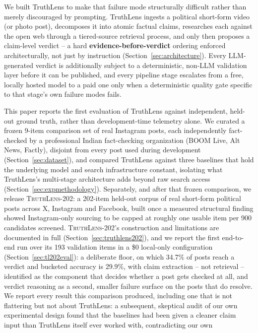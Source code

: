 \documentclass[conference]{IEEEtran}
\begin{document}
We built TruthLens to make that failure mode structurally difficult
rather than merely discouraged by prompting. TruthLens ingests a
political short-form video (or photo post), decomposes it into atomic
factual claims, researches each against the open web through a
tiered-source retrieval process, and only then proposes a claim-level
verdict -- a hard \textbf{evidence-before-verdict} ordering enforced
architecturally, not just by instruction (Section~\ref{sec:architecture}).
Every LLM-generated verdict is additionally subject to a deterministic,
non-LLM validation layer before it can be published, and every pipeline
stage escalates from a free, locally hosted model to a paid one only when
a deterministic quality gate specific to that stage's own failure modes
fails.

This paper reports the first evaluation of TruthLens against independent,
held-out ground truth, rather than development-time telemetry alone. We
curated a frozen 9-item comparison set of real Instagram posts, each
independently fact-checked by a professional Indian fact-checking
organization (BOOM Live, Alt News, Factly), disjoint from every post
used during development (Section~\ref{sec:dataset}), and compared
TruthLens against three baselines that hold the underlying model and
search infrastructure constant, isolating what TruthLens's multi-stage
architecture adds beyond raw search access
(Section~\ref{sec:expmethodology}). Separately, and after that frozen
comparison, we release \textsc{TruthLens-202}: a 202-item held-out
corpus of real short-form political posts across X, Instagram and
Facebook, built once a measured structural finding showed
Instagram-only sourcing to be capped at roughly one usable item per 900
candidates screened. \textsc{TruthLens-202}'s construction and limitations are documented in
full (Section~\ref{sec:truthlens202}), and we report the first
end-to-end run over its 193 validation items in a \$0 local-only
configuration (Section~\ref{sec:tl202eval}): a deliberate floor, on
which 34.7\% of posts reach a verdict and bucketed accuracy is 29.9\%,
with claim extraction -- not retrieval -- identified as the component
that decides whether a post gets checked at all, and verdict reasoning
as a second, smaller failure surface on the posts that do resolve. We report every
result this comparison produced, including one that is not flattering
but not about TruthLens: a subsequent, skeptical audit of our own
experimental design found that the baselines had been given a cleaner
claim input than TruthLens itself ever worked with, contradicting our own
\end{document}
